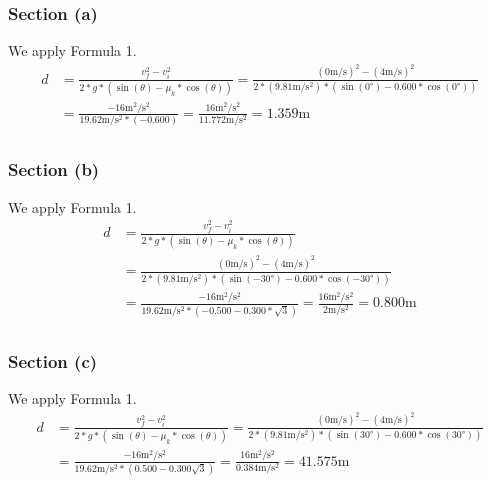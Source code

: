 \documentclass[12pt]{article}
\begin{document}
\subsubsection*{Section (a)}
We apply Formula 1.
\begin{align*}
    d   &=  \frac{v_f^2 - v_i^2}{2*g*(\sin(\theta)-\mu_k*\cos(\theta))}
        =   \frac{(0\unit{\meter/\second})^2 - (4\unit{\meter/\second})^2}{2*(9.81\unit{\meter/\second^2})*(\sin(0\unit{\degree})-0.600*\cos(0\unit{\degree}))}\\
        &=  \frac{ - 16\unit{\meter^2/\second^2}}{19.62\unit{\meter/\second^2}*(-0.600)}
        =   \frac{16\unit{\meter^2/\second^2}}{11.772\unit{\meter/\second^2}}
        =   \boxed{1.359\unit{\meter}}\\
\end{align*}

\subsubsection*{Section (b)}
We apply Formula 1.
\begin{align*}
    d   &=  \frac{v_f^2 - v_i^2}{2*g*(\sin(\theta)-\mu_k*\cos(\theta))}\\
        &=   \frac{(0\unit{\meter/\second})^2 - (4\unit{\meter/\second})^2}{2*(9.81\unit{\meter/\second^2})*(\sin(-30\unit{\degree})-0.600*\cos(-30\unit{\degree}))}\\
        &=  \frac{ - 16\unit{\meter^2/\second^2}}{19.62\unit{\meter/\second^2}*(-0.500-0.300*\sqrt{3})}
        =   \frac{16\unit{\meter^2/\second^2}}{2\unit{\meter/\second^2}}
        =   \boxed{0.800\unit{\meter}}\\
\end{align*}

\subsubsection*{Section (c)}
We apply Formula 1.
\begin{align*}
    d   &=  \frac{v_f^2 - v_i^2}{2*g*(\sin(\theta)-\mu_k*\cos(\theta))}
        =   \frac{(0\unit{\meter/\second})^2 - (4\unit{\meter/\second})^2}{2*(9.81\unit{\meter/\second^2})*(\sin(30\unit{\degree})-0.600*\cos(30\unit{\degree}))}\\
        &=  \frac{ - 16\unit{\meter^2/\second^2}}{19.62\unit{\meter/\second^2}*(0.500-0.300\sqrt{3})}
        =   \frac{16\unit{\meter^2/\second^2}}{0.384\unit{\meter/\second^2}}
        =   \boxed{41.575\unit{\meter}}\\
\end{align*}
\end{document}
